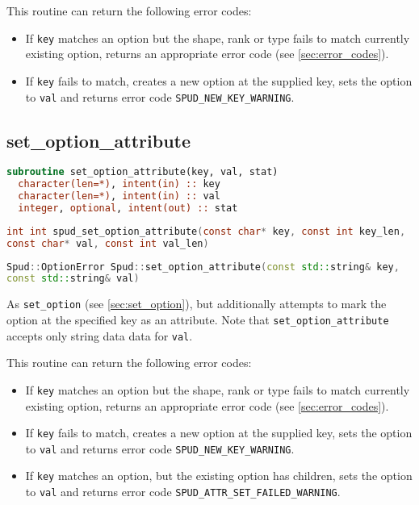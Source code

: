 \documentclass[a4paper, 11pt]{book}
\begin{document}
This routine can return the following error codes:
\begin{itemize}
\item If \lstinline+key+ matches an option but the shape, rank or type fails
  to match currently existing option, returns an appropriate error code (see
  \ref{sec:error_codes}).
\item If \lstinline+key+ fails to match, creates a new option at the supplied
  key, sets the option to \lstinline+val+ and returns error code
  \lstinline+SPUD_NEW_KEY_WARNING+.
\end{itemize}

\subsection{set\_option\_attribute}

\begin{lstlisting}[language=fortran]
subroutine set_option_attribute(key, val, stat)
  character(len=*), intent(in) :: key
  character(len=*), intent(in) :: val
  integer, optional, intent(out) :: stat
\end{lstlisting}

\begin{lstlisting}[language=C]
int int spud_set_option_attribute(const char* key, const int key_len,
const char* val, const int val_len)
\end{lstlisting}

\begin{lstlisting}[language=C++]
Spud::OptionError Spud::set_option_attribute(const std::string& key,
const std::string& val)
\end{lstlisting}

As \lstinline+set_option+ (see \ref{sec:set_option}), but additionally attempts
to mark the option at the specified key as an attribute. Note that
\lstinline+set_option_attribute+ accepts only string data data for
\lstinline+val+.

This routine can return the following error codes:
\begin{itemize}
\item If \lstinline+key+ matches an option but the shape, rank or type fails
  to match currently existing option, returns an appropriate error code (see
  \ref{sec:error_codes}).
\item If \lstinline+key+ fails to match, creates a new option at the supplied
  key, sets the option to \lstinline+val+ and returns error code
  \lstinline+SPUD_NEW_KEY_WARNING+.
\item If \lstinline+key+ matches an option, but the existing option has
  children, sets the option to \lstinline+val+ and returns error code
  \lstinline+SPUD_ATTR_SET_FAILED_WARNING+.
\end{itemize}
\end{document}
